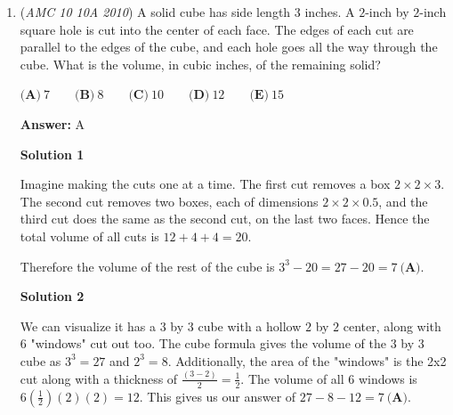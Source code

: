 \begin{enumerate}
 



\textbf{Solution 2(Trick)}

We find that $\frac{AB}{BC}=\frac{3}{8}$ by the \href{https://artofproblemsolving.com/wiki/index.php?title=Angle\_Bisector\_Theorem}{Angle Bisector Theorem} so we let the lengths be $3n$ and $8n$, respectively where $n$ is a positive integer. Also since $AD=3$ and $BC=8$, we notice that the perimeter of the triangle is the sum of these, namely $3n+8n+3+8=11n+11.$ This can be factored into $11(n+1)$ and so the sum must be a multiple of $11$. The only answer choice which is a multiple of $11$ is $\boxed{\textbf{(B)} 33}$. ~mathboy282

 


	\item (\textit{AMC 10 10A 2010}) A solid cube has side length $3$ inches. A $2$-inch by $2$-inch square hole is cut into the center of each face. The edges of each cut are parallel to the edges of the cube, and each hole goes all the way through the cube. What is the volume, in cubic inches, of the remaining solid?


 $\textbf{(A)}\ 7 \qquad \textbf{(B)}\ 8 \qquad \textbf{(C)}\ 10 \qquad \textbf{(D)}\ 12 \qquad \textbf{(E)}\ 15$

 \textbf{Answer: }A



\textbf{Solution 1}

Imagine making the cuts one at a time. The first cut removes a box $2\times 2\times 3$. The second cut removes two boxes, each of dimensions $2\times 2\times 0.5$, and the third cut does the same as the second cut, on the last two faces. Hence the total volume of all cuts is $12 + 4 + 4 = 20$.

 Therefore the volume of the rest of the cube is $3^3 - 20 = 27 - 20 = \boxed{7\ \textbf{(A)}}$.

 



\textbf{Solution 2}

We can visualize it has a $3$ by $3$ cube with a hollow $2$ by $2$ center, along with 6 "windows" cut out too. The cube formula gives the volume of the $3$ by $3$ cube as $3^3 = 27$ and $2^3 = 8.$ Additionally, the area of the "windows" is the 2x2 cut along with a thickness of $\frac{(3-2)}{2} = \frac{1}{2}.$ The volume of all 6 windows is $6(\frac{1}{2})(2)(2) = 12.$ This gives us our answer of $27 - 8 - 12 = \boxed{7\ \textbf{(A)}}.$





\end{enumerate}
